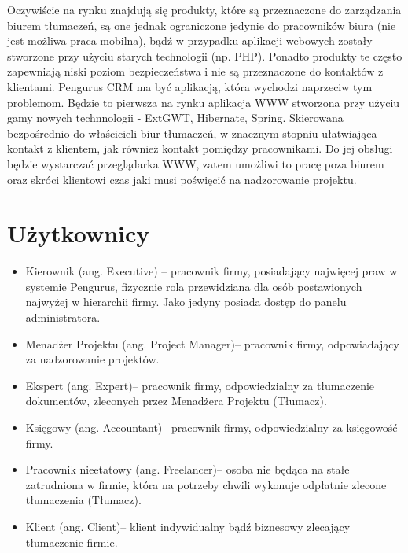 \documentclass[licencjacka]{pracamgr}
\begin{document}
Oczywiście na rynku znajdują się produkty, które są przeznaczone do zarządzania biurem tłumaczeń, 
są one jednak ograniczone jedynie do pracowników biura (nie jest możliwa praca mobilna),
bądź w przypadku aplikacji webowych zostały stworzone przy użyciu starych technologii (np. PHP). 
Ponadto produkty te często zapewniają niski poziom bezpieczeństwa i nie są przeznaczone do kontaktów z klientami.
Pengurus CRM ma być aplikacją, która wychodzi naprzeciw tym problemom. 
Będzie to pierwsza na rynku aplikacja WWW stworzona przy użyciu gamy nowych technnologii - ExtGWT, Hibernate, Spring.
Skierowana bezpośrednio do właścicieli biur tłumaczeń, w znacznym stopniu ułatwiająca kontakt z klientem, jak również kontakt pomiędzy pracownikami. 
Do jej obsługi będzie wystarczać przeglądarka WWW, zatem umożliwi to pracę poza biurem
oraz skróci klientowi czas jaki musi poświęcić na nadzorowanie projektu. 

\section{Użytkownicy}
\begin{itemize}
\item Kierownik (ang. Executive) – pracownik firmy, posiadający najwięcej praw w systemie Pengurus, fizycznie rola przewidziana dla osób postawionych najwyżej w hierarchii firmy. Jako jedyny posiada dostęp do panelu administratora.
\item Menadżer Projektu (ang. Project Manager)– pracownik firmy, odpowiadający za nadzorowanie projektów.
\item Ekspert (ang. Expert)– pracownik firmy, odpowiedzialny za tłumaczenie dokumentów, zleconych przez Menadżera Projektu (Tłumacz).
\item Księgowy (ang. Accountant)– pracownik firmy, odpowiedzialny za księgowość firmy.
\item Pracownik nieetatowy (ang. Freelancer)– osoba nie będąca na stałe zatrudniona w firmie, która na potrzeby chwili wykonuje odpłatnie zlecone tłumaczenia (Tłumacz).
\item Klient (ang. Client)– klient indywidualny bądź biznesowy zlecający tłumaczenie firmie.
\end{itemize}
\end{document}
